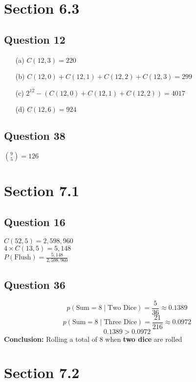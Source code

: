 \documentclass{article}
\begin{document}
\section*{Section 6.3}
\subsection*{Question 12}
\begin{itemize}
    \item[(a)] \( C(12, 3) = 220 \)
    \item[(b)] \( C(12, 0) + C(12, 1) + C(12, 2) + C(12, 3) = 299 \)
    \item[(c)] \( 2^{12} - (C(12, 0) + C(12, 1) + C(12, 2)) = 4017 \)
    \item[(d)] \( C(12, 6) = 924 \)
\end{itemize}

\subsection*{Question 38}
\( \binom{9}{5} = 126 \)

\section*{Section 7.1}
\subsection*{Question 16}
 \( C(52, 5) = 2,598,960 \) \\
 \( 4 \times C(13, 5) = 5,148 \) \\
\( P(\text{Flush}) = \frac{5,148}{2,598,960}\) \\

\subsection*{Question 36}
\[
p(\text{Sum} = 8 \mid \text{Two Dice}) = \frac{5}{36}  \approx 0.1389
\]
\[
p(\text{Sum} = 8 \mid \text{Three Dice}) = \frac{21}{216} \approx 0.0972
\]
\[
0.1389 > 0.0972
\]
\textbf{Conclusion:} Rolling a total of 8 when \textbf{two dice} are rolled

\section*{Section 7.2}
\end{document}
